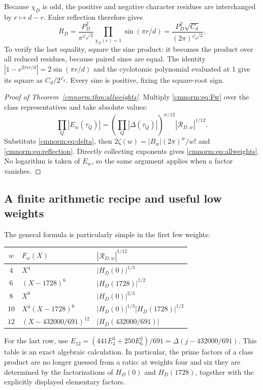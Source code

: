 Because $\chi_D$ is odd, the positive and negative character residues
are interchanged by $r\mapsto d-r$. Euler reflection therefore gives
\begin{equation}
 R_D=\frac{P_D^2}{\pi^{\varphi_d/2}}
       \prod_{\chi_D(r)=1}\sin(\pi r/d)
     =\frac{P_D^2\sqrt{C_d}}{(2\pi)^{\varphi_d/2}}.
 \label{cmnorm:eq:reflection}
\end{equation}
To verify the last equality, square the sine product: it becomes the
product over all reduced residues, because paired sines are equal.
The identity $|1-e^{2\pi ir/d}|=2\sin(\pi r/d)$ and the cyclotomic
polynomial evaluated at $1$ give its square as $C_d/2^{\varphi_d}$.
Every sine is positive, fixing the square-root sign.

\begin{proof}[Proof of Theorem~\ref{cmnorm:thm:allweights}]
Multiply \eqref{cmnorm:eq:Fw} over the class representatives and take
absolute values:
\[
 \prod_Q|E_w(\tau_Q)|
 =\left(\prod_Q|\Delta(\tau_Q)|\right)^{w/12}
       |\mathcal R_{D,w}|^{1/12}.
\]
Substitute \eqref{cmnorm:eq:delta}, then
$2\zeta(w)=|B_w|(2\pi)^w/w!$ and
\eqref{cmnorm:eq:reflection}. Directly collecting exponents gives
\eqref{cmnorm:eq:allweights}. No logarithm is taken of $E_w$, so the
same argument applies when a factor vanishes.
\end{proof}

\subsection{A finite arithmetic recipe and useful low weights}

The general formula is particularly simple in the first few weights:
\begin{center}
\begin{tabular}{c l l}
\toprule
$w$ & $F_w(X)$ & $|\mathcal R_{D,w}|^{1/12}$\\
\midrule
$4$ & $X^4$ & $|H_D(0)|^{1/3}$\\
$6$ & $(X-1728)^6$ & $|H_D(1728)|^{1/2}$\\
$8$ & $X^8$ & $|H_D(0)|^{2/3}$\\
$10$ & $X^4(X-1728)^6$ & $|H_D(0)|^{1/3}|H_D(1728)|^{1/2}$\\
$12$ & $(X-432000/691)^{12}$ & $|H_D(432000/691)|$\\
\bottomrule
\end{tabular}
\end{center}
For the last row, use
$E_{12}=(441E_4^3+250E_6^2)/691
       =\Delta(j-432000/691)$.
This table is an exact algebraic calculation. In particular, the prime
factors of a class product are no longer guessed from a ratio: at weights
four and six they are determined by the factorizations of $H_D(0)$ and
$H_D(1728)$, together with the explicitly displayed elementary factors.

